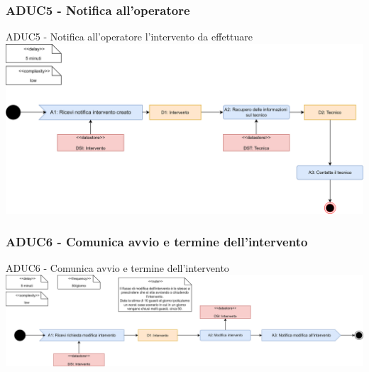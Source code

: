 \documentclass{beamer}
\begin{document}
		\begin{frame}
		\subsubsection{ADUC5 - Notifica all'operatore}	
			\begin{block}{ADUC5 - Notifica all'operatore l'intervento da effettuare}
				\includegraphics[width=\textwidth, height=0.85\textheight, keepaspectratio=true]{ADUC5.png}
			\end{block}
		\end{frame}	

		\begin{frame}
		\subsubsection{ADUC6 - Comunica avvio e termine dell'intervento}			
			\begin{block}{ADUC6 - Comunica avvio e termine dell'intervento}
				\includegraphics[width=\textwidth, height=0.85\textheight, keepaspectratio=true]{ADUC6.png}
			\end{block}
		\end{frame}	
	
\end{document}
